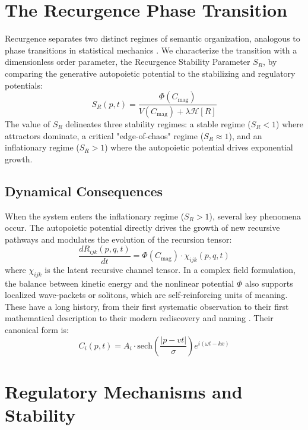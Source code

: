 \section{The Recurgence Phase Transition}

Recurgence separates two distinct regimes of semantic organization, analogous to phase transitions in statistical mechanics \autocite{Landau1937, Stanley1971, Goldenfeld1992}. We characterize the transition with a dimensionless order parameter, the Recurgence Stability Parameter \(S_R\), by comparing the generative autopoietic potential to the stabilizing and regulatory potentials:
\begin{equation}
S_R(p,t) = \frac{\Phi(C_{\mathrm{mag}})}{V(C_{\mathrm{mag}}) + \lambda \mathcal{H}[R]}
\end{equation}
The value of \(S_R\) delineates three stability regimes: a stable regime (\(S_R < 1\)) where attractors dominate, a critical "edge-of-chaos" regime (\(S_R \approx 1\)), and an inflationary regime (\(S_R > 1\)) where the autopoietic potential drives exponential growth.

\subsection{Dynamical Consequences}

When the system enters the inflationary regime (\(S_R > 1\)), several key phenomena occur. The autopoietic potential directly drives the growth of new recursive pathways and modulates the evolution of the recursion tensor:
\begin{equation}
\frac{dR_{ijk}(p,q,t)}{dt} = \Phi(C_{\mathrm{mag}}) \cdot \chi_{ijk}(p,q,t)
\end{equation}
where \(\chi_{ijk}\) is the latent recursive channel tensor. In a complex field formulation, the balance between kinetic energy and the nonlinear potential \(\Phi\) also supports localized wave-packets or solitons, which are self-reinforcing units of meaning. These have a long history, from their first systematic observation \autocite{Russell1845} to their first mathematical description \autocite{KortewegdeVries1895} to their modern rediscovery and naming \autocite{ZabuskyKruskal1965}. Their canonical form is:
\begin{equation}
C_i(p,t) = A_i \cdot \text{sech}\left(\frac{|p-vt|}{\sigma}\right) e^{i(\omega t - kx)}
\end{equation}

\section{Regulatory Mechanisms and Stability}

